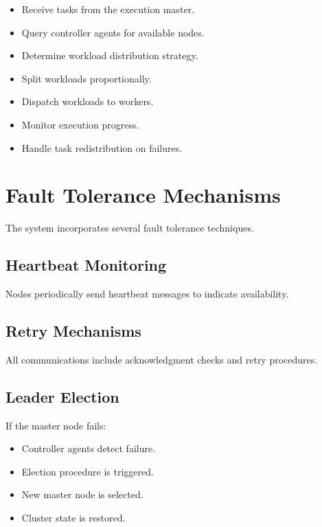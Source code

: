 \documentclass[12pt,a4paper]{article}
\begin{document}
\begin{itemize}
    \item Receive tasks from the execution master.
    \item Query controller agents for available nodes.
    \item Determine workload distribution strategy.
    \item Split workloads proportionally.
    \item Dispatch workloads to workers.
    \item Monitor execution progress.
    \item Handle task redistribution on failures.
\end{itemize}

\newpage

\section{Fault Tolerance Mechanisms}

The system incorporates several fault tolerance techniques.

\subsection{Heartbeat Monitoring}

Nodes periodically send heartbeat messages to indicate availability.

\subsection{Retry Mechanisms}

All communications include acknowledgment checks and retry procedures.

\subsection{Leader Election}

If the master node fails:

\begin{itemize}
    \item Controller agents detect failure.
    \item Election procedure is triggered.
    \item New master node is selected.
    \item Cluster state is restored.
\end{itemize}
\end{document}
